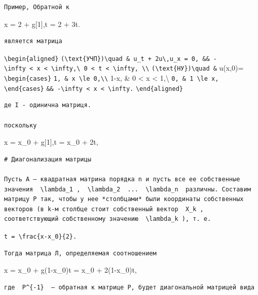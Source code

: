 \documentclass[
  ukrainian,
]{article}
\begin{document}
\begin{verbatim}
Пример, Обратной к
\end{verbatim}

x = 2 + g{[}1{]},t = 2 + 3t.

\begin{verbatim}
является матрица
\end{verbatim}

\texttt{\textbackslash{}begin\{aligned\}}
\texttt{(\textbackslash{}text\{УЧП\})\textbackslash{}quad\ \&\ u\_t\ +\ 2u\textbackslash{},u\_x\ =\ 0,\ \&\&\ -\textbackslash{}infty\ \textless{}\ x\ \textless{}\ \textbackslash{}infty,\textbackslash{}\ 0\ \textless{}\ t\ \textless{}\ \textbackslash{}infty,\ \textbackslash{}\textbackslash{}}
\texttt{(\textbackslash{}text\{НУ\})\textbackslash{}quad\ \&} u(x,0)=
\texttt{\textbackslash{}begin\{cases\}}
\texttt{1,\ \&\ x\ \textbackslash{}le\ 0,\textbackslash{}\textbackslash{}}
1-x, \& 0 \textless{} x \textless{} 1,\textbackslash{}
\texttt{0,\ \&\ 1\ \textbackslash{}le\ x,}
\texttt{\textbackslash{}end\{cases\}}
\texttt{\&\&\ -\textbackslash{}infty\ \textless{}\ x\ \textless{}\ \textbackslash{}infty.}
\texttt{\textbackslash{}end\{aligned\}}

\begin{verbatim}
де I - одинична матриця.

поскольку
\end{verbatim}

x = x\_0 + g{[}1{]},t = x\_0 + 2t,

\begin{verbatim}
# Диагонализация матрицы

Пусть A — квадратная матрина порядка n и пусть все ее собственные значения  \lambda_1 ,  \lambda_2  ...  \lambda_n  различны. Составим матрицу P так, чтобы у нее *столбцами* были координаты собственных векторов (в k-м столбце стоит собственный вектор  X_k , соответствующий собственному значению  \lambda_k ), т. е.
\end{verbatim}

\texttt{t\ =\ \textbackslash{}frac\{x-x\_0\}\{2\}.}

\begin{verbatim}
Тогда матрица Л, определяемая соотношением
\end{verbatim}

x = x\_0 + g(1-x\_0)t = x\_0 + 2(1-x\_0)t,

\begin{verbatim}
где  P^{-1}  — обратная к матрице P, будет диагональной матрицей вида
\end{verbatim}
\end{document}
